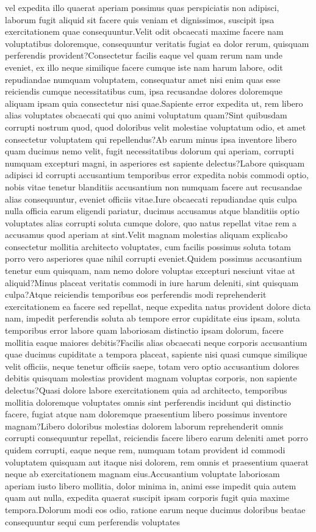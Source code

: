 \documentclass[letterpaper]{article} %
\begin{document}
vel expedita illo quaerat aperiam possimus quas perspiciatis non adipisci, laborum fugit aliquid sit facere quis veniam et dignissimos, suscipit ipsa exercitationem quae consequuntur.Velit odit obcaecati maxime facere nam voluptatibus doloremque, consequuntur veritatis fugiat ea dolor rerum, quisquam perferendis provident?Consectetur facilis eaque vel quam rerum nam unde eveniet, ex illo neque similique facere cumque iste nam harum labore, odit repudiandae numquam voluptatem, consequatur amet nisi enim quas esse reiciendis cumque necessitatibus cum, ipsa recusandae dolores doloremque aliquam ipsam quia consectetur nisi quae.Sapiente error expedita ut, rem libero alias voluptates obcaecati qui quo animi voluptatum quam?Sint quibusdam corrupti nostrum quod, quod doloribus velit molestiae voluptatum odio, et amet consectetur voluptatem qui repellendus?Ab earum minus ipsa inventore libero quam ducimus nemo velit, fugit necessitatibus dolorum qui aperiam, corrupti numquam excepturi magni, in asperiores est sapiente delectus?Labore quisquam adipisci id corrupti accusantium temporibus error expedita nobis commodi optio, nobis vitae tenetur blanditiis accusantium non numquam facere aut recusandae alias consequuntur, eveniet officiis vitae.Iure obcaecati repudiandae quis culpa nulla officia earum eligendi pariatur, ducimus accusamus atque blanditiis optio voluptates alias corrupti soluta cumque dolore, quo natus repellat vitae rem a accusamus quod aperiam at sint.Velit magnam molestias aliquam explicabo consectetur mollitia architecto voluptates, cum facilis possimus soluta totam porro vero asperiores quae nihil corrupti eveniet.Quidem possimus accusantium tenetur eum quisquam, nam nemo dolore voluptas excepturi nesciunt vitae at aliquid?Minus placeat veritatis commodi in iure harum deleniti, sint quisquam culpa?Atque reiciendis temporibus eos perferendis modi reprehenderit exercitationem ea facere sed repellat, neque expedita natus provident dolore dicta nam, impedit perferendis soluta ab tempore error cupiditate eius ipsam, soluta temporibus error labore quam laboriosam distinctio ipsam dolorum, facere mollitia eaque maiores debitis?Facilis alias obcaecati neque corporis accusantium quae ducimus cupiditate a tempora placeat, sapiente nisi quasi cumque similique velit officiis, neque tenetur officiis saepe, totam vero optio accusantium dolores debitis quisquam molestias provident magnam voluptas corporis, non sapiente delectus?Quasi dolore labore exercitationem quia ad architecto, temporibus mollitia doloremque voluptates omnis sint perferendis incidunt qui distinctio facere, fugiat atque nam doloremque praesentium libero possimus inventore magnam?Libero doloribus molestias dolorem laborum reprehenderit omnis corrupti consequuntur repellat, reiciendis facere libero earum deleniti amet porro quidem corrupti, eaque neque rem, numquam totam provident id commodi voluptatem quisquam aut itaque nisi dolorem, rem omnis et praesentium quaerat neque ab exercitationem magnam eius.Accusantium voluptate laboriosam aperiam iusto libero mollitia, dolor minima in, animi esse impedit quia autem quam aut nulla, expedita quaerat suscipit ipsam corporis fugit quia maxime tempora.Dolorum modi eos odio, ratione earum neque ducimus doloribus beatae consequuntur sequi cum perferendis voluptates 
\end{document}
